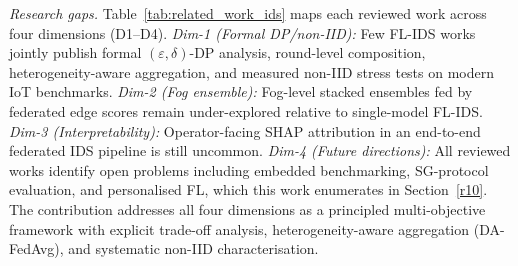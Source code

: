 \documentclass[sensors,article,submit,pdftex,moreauthors]{Definitions/mdpi}
\begin{document}
\noindent\textit{Research gaps.} Table~\ref{tab:related_work_ids} maps each reviewed work across four dimensions (D1--D4). \textit{Dim-1 (Formal DP/non-IID):} Few FL-IDS works jointly publish formal $(\varepsilon,\delta)$-DP analysis, round-level composition, heterogeneity-aware aggregation, and measured non-IID stress tests on modern IoT benchmarks. \textit{Dim-2 (Fog ensemble):} Fog-level stacked ensembles fed by federated edge scores remain under-explored relative to single-model FL-IDS. \textit{Dim-3 (Interpretability):} Operator-facing SHAP attribution in an end-to-end federated IDS pipeline is still uncommon. \textit{Dim-4 (Future directions):} All reviewed works identify open problems including embedded benchmarking, SG-protocol evaluation, and personalised FL, which this work enumerates in Section~\ref{r10}. The contribution addresses all four dimensions as a principled multi-objective framework with explicit trade-off analysis, heterogeneity-aware aggregation (DA-FedAvg), and systematic non-IID characterisation.
\end{document}

